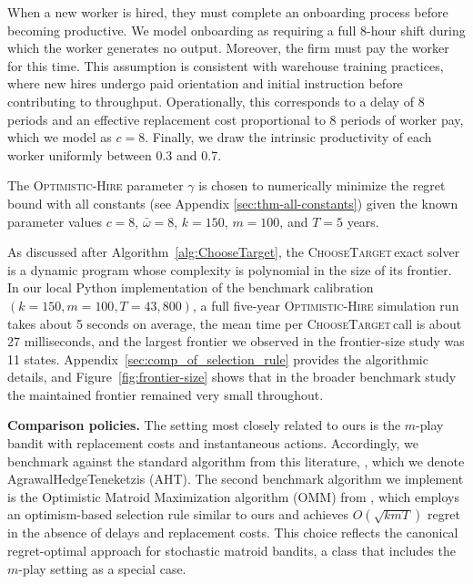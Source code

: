 \documentclass[opre,blindrev]{informs3}
\newcommand{\ChooseTarget}{\textsc{ChooseTarget}\,}
\begin{document}
When a new worker is hired, they must complete an onboarding process before becoming productive. We model onboarding as requiring a full 8-hour shift during which the worker generates no output. Moreover, the firm must pay the worker for this time. This assumption is consistent with warehouse training practices, where new hires undergo paid orientation and initial instruction before contributing to throughput. Operationally, this corresponds to a delay of \(8\) periods and an effective replacement cost proportional to 8 periods of worker pay, which we model as \(c=8\). Finally, we draw the intrinsic productivity of each worker uniformly between 0.3 and 0.7. 

The \textsc{Optimistic-Hire} parameter \(\gamma\) is chosen to numerically minimize the regret bound with all constants (see Appendix \ref{sec:thm-all-constants}) given the known parameter values \(c=8\), \(\bar{\omega}=8\), \(k=150\), \(m=100\), and \(T=5\) years. 

\begin{remark}
    As discussed after Algorithm~\ref{alg:ChooseTarget}, the \ChooseTarget exact solver is a dynamic program whose complexity is polynomial in the size of its frontier. In our local Python implementation of the benchmark calibration \((k=150,m=100,T=43{,}800)\), a full five-year \textsc{Optimistic-Hire} simulation run takes about 5 seconds on average, the mean time per \ChooseTarget call is about 27 milliseconds, and the largest frontier we observed in the frontier-size study was 11 states. Appendix~\ref{sec:comp_of_selection_rule} provides the algorithmic details, and Figure~\ref{fig:frontier-size} shows that in the broader benchmark study the maintained frontier remained very small throughout. 
\end{remark}

{\bf Comparison policies.}
The setting most closely related to ours is the \(m\)-play bandit with replacement costs and instantaneous actions. Accordingly, we benchmark against the standard algorithm from this literature, \cite{agrawal1990switching}, which we denote AgrawalHedgeTeneketzis (\textsc{AHT}). The second benchmark algorithm we implement is the Optimistic Matroid Maximization algorithm (\textsc{OMM}) from \cite{kveton2014matroid}, which employs an optimism-based selection rule similar to ours and achieves \(O(\sqrt{kmT})\) regret in the absence of delays and replacement costs. This choice reflects the canonical regret-optimal approach for stochastic matroid bandits, a class that includes the \(m\)-play setting as a special case.
\end{document}
